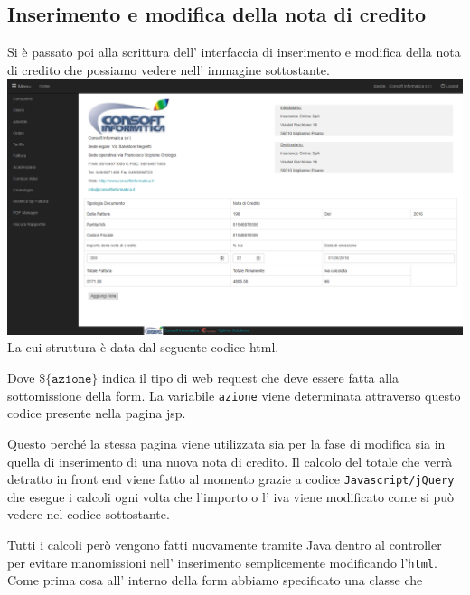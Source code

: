 \documentclass[12pt]{book}
\begin{document}
\subsection{Inserimento e modifica della nota di credito}
Si è passato poi alla scrittura dell' interfaccia di inserimento e modifica
della nota di credito che possiamo vedere nell' immagine sottostante.
\newline
\newline
\includegraphics[scale=0.4]{img/inserimento_nota_credito}
\newline
La cui struttura è data dal seguente codice html.

Dove \(\texttt{\$\{azione\}}\) indica il tipo di web request che deve essere
fatta alla sottomissione della form.
La variabile \texttt{azione} viene determinata attraverso questo codice 
presente nella pagina jsp.

Questo perché la stessa pagina viene utilizzata sia per la fase di modifica sia
in quella di inserimento di una nuova nota di credito.
Il calcolo del totale che verrà detratto in front end viene fatto al momento 
grazie a codice \texttt{Javascript/jQuery} che esegue i calcoli ogni 
volta che l'importo o l' iva viene modificato come si può vedere nel 
codice sottostante.

Tutti i calcoli però vengono fatti nuovamente tramite Java dentro al controller
per evitare manomissioni nell' inserimento semplicemente modificando 
l'\texttt{html}.
Come prima cosa all' interno della form abbiamo specificato una classe che 
\end{document}
